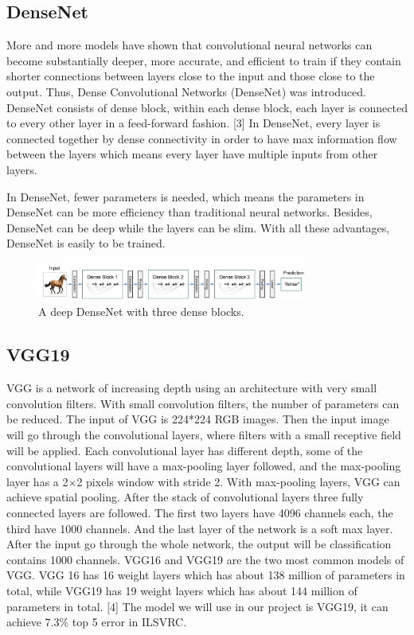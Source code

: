 \documentclass{article}
\begin{document}

\subsection{DenseNet}

More and more models have shown that convolutional neural networks can become substantially deeper, more accurate, and efficient to train if they contain shorter connections between layers close to the input and those close to the output. Thus, Dense Convolutional Networks (DenseNet) was introduced. DenseNet consists of dense block, within each dense block, each layer is connected to every other layer in a feed-forward fashion. [3] In DenseNet, every layer is connected together by dense connectivity in order to have max information flow between the layers which means every layer have multiple inputs from other layers. 

In DenseNet, fewer parameters is needed, which means the parameters in DenseNet can be more efficiency than traditional neural networks. Besides, DenseNet can be deep while the layers can be slim. With all these advantages, DenseNet is easily to be trained.

\begin{figure}[H]
	\centering
	\includegraphics[width=3.5in]{pics/densenet} 
	\caption{A deep DenseNet with three dense blocks.}
\end{figure}

\subsection{VGG19}

VGG is a network of increasing depth using an architecture with very small convolution filters. With small convolution filters, the number of parameters can be reduced. The input of VGG is 224*224 RGB images. Then the input image will go through the convolutional layers, where filters with a small receptive field will be applied. Each convolutional layer has different depth, some of the convolutional layers will have a max-pooling layer followed, and the max-pooling layer has a 2$\times$2 pixels window with stride 2. With max-pooling layers, VGG can achieve spatial pooling. After the stack of convolutional layers three fully connected layers are followed. The first two layers have 4096 channels each, the third have 1000 channels. And the last layer of the network is a soft max layer. After the input go through the whole network, the output will be classification contains 1000 channels. VGG16 and VGG19 are the two most common models of VGG. VGG 16 has 16 weight layers which has about 138 million of parameters in total, while VGG19 has 19 weight layers which has about 144 million of parameters in total. [4] The model we will use in our project is VGG19, it can achieve 7.3\% top 5 error in ILSVRC.
\end{document}
